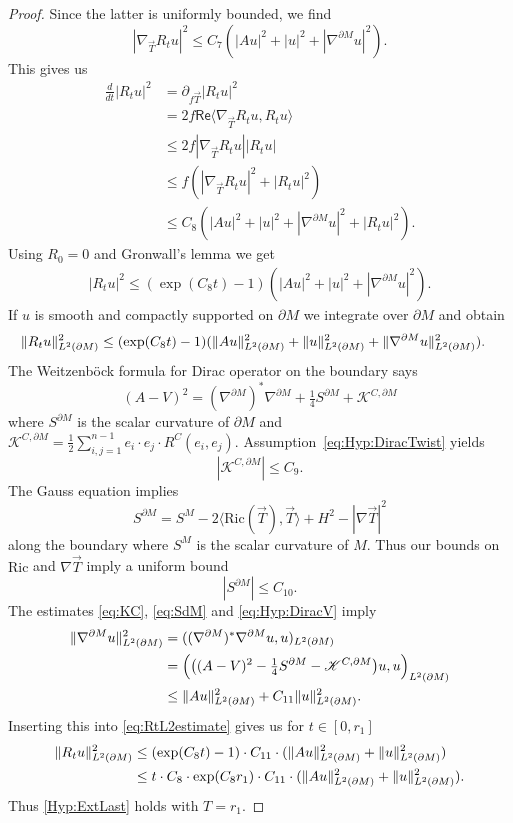 \documentclass[a4paper,10pt,reqno]{amsart}
\newcommand{\Lp}[2][{}]{{\rm L}^{#2}_{\rm #1}}%
\newcommand{\Ric}{\mathrm{Ric}}
\newcommand{\KK}{\mathscr{K}}
\newcommand{\dM}{\partial M}
\theoremstyle{definition}
\begin{document}
\begin{proof}
Since the latter is uniformly bounded, we find
\begin{equation}
|\nabla_{\vec{T}}R_t u|^2
\le
C_7(|Au|^2+|u|^2+|\nabla^{\dM} u|^2) .
\end{equation}
This gives us
\begin{align*}
\tfrac{d}{dt}|R_tu|^2
 & =
\partial_{f\vec{T}}|R_tu|^2                          \\
 & =
2f\mathsf{Re}\langle\nabla_{\vec{T}}R_tu,R_tu\rangle \\
 & \le
2f|\nabla_{\vec{T}}R_tu||R_tu|                       \\
 & \le
f(|\nabla_{\vec{T}}R_tu|^2+|R_tu|^2)                 \\
 & \le
C_8(|Au|^2+|u|^2+|\nabla^{\dM} u|^2+|R_tu|^2) .
\end{align*}
Using $R_0=0$ and Gronwall's lemma we get
\begin{align*}
|R_tu|^2
\le
(\exp(C_8t)-1)(|Au|^2+|u|^2+|\nabla^{\dM} u|^2).
\end{align*}
If $u$ is smooth and compactly supported on $\dM$ we integrate over $\dM$ and obtain
\begin{align}
\|R_tu\|^2_{\Lp{2}(\dM)}
 & \le
(\exp(C_8t)-1)(\|Au\|^2_{\Lp{2}(\dM)}+\|u\|^2_{\Lp{2}(\dM)}+\|\nabla^{\dM} u\|^2_{\Lp{2}(\dM)}) .
\label{eq:RtL2estimate}
\end{align}
The Weitzenböck formula for Dirac operator on the boundary says
$$
(A-V)^2 = (\nabla^{\dM})^*\nabla^{\dM} + \tfrac14 S^{\dM} + \KK^{C,\dM}
$$
where $S^{\dM}$ is the scalar curvature of $\dM$ and $\KK^{C,\dM} = \tfrac12 \sum_{i,j=1}^{n-1} e_i\cdot e_j\cdot R^C(e_i,e_j)$.
Assumption~\ref{eq:Hyp:DiracTwist} yields
\begin{equation}
|\KK^{C,\dM}| \le C_9.
\label{eq:KC}
\end{equation}
The Gauss equation implies
$$
S^{\dM} = S^{M} - 2\langle \Ric(\vec{T}),\vec{T}\rangle + H^2 -|\nabla\vec{T}|^2
$$
along the boundary where $S^{M}$ is the scalar curvature of $M$.
Thus our bounds on $\Ric$ and $\nabla\vec{T}$ imply a uniform bound
\begin{equation}
|S^{\dM}| \le C_{10} .
\label{eq:SdM}
\end{equation}
The estimates \eqref{eq:KC}, \eqref{eq:SdM} and \ref{eq:Hyp:DiracV} imply
\begin{align*}
\|\nabla^{\dM} u\|^2_{\Lp{2}(\dM)}
 & =
((\nabla^{\dM})^*\nabla^{\dM}u,u)_{\Lp{2}(\dM)}                 \\
 & =
\Big(\big((A-V)^2-\tfrac14 S^{\dM}-\KK^{C,\dM}\big)u,u\Big)_{\Lp{2}(\dM)} \\
 & \le
\|Au\|^2_{\Lp{2}(\dM)} + C_{11}\|u\|^2_{\Lp{2}(\dM)} .
\end{align*}
Inserting this into \eqref{eq:RtL2estimate} gives us for $t\in [0,r_1]$
\begin{align*}
\|R_tu\|^2_{\Lp{2}(\dM)}
 & \le
(\exp(C_8t)-1)\cdot C_{11}\cdot (\|Au\|^2_{\Lp{2}(\dM)}+\|u\|^2_{\Lp{2}(\dM)}) \\
 & \le
t\cdot C_8\cdot \exp(C_8r_1)\cdot C_{11}\cdot (\|Au\|^2_{\Lp{2}(\dM)}+\|u\|^2_{\Lp{2}(\dM)}) .
\end{align*}
Thus \ref{Hyp:ExtLast} holds with $T=r_1$.
\end{proof}
\end{document}
